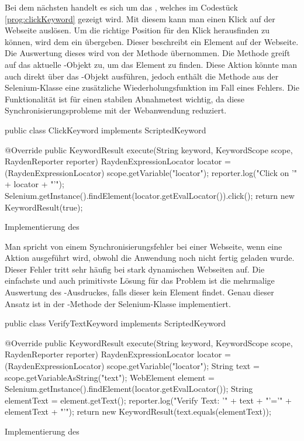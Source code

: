 \SuperPar
Bei dem nächsten  handelt es sich um das , welches im Codestück \ref{prog:clickKeyword} gezeigt wird. Mit diesem  kann man einen Klick auf der Webseite auslösen. Um die richtige Position für den Klick herausfinden zu können, wird dem  ein  übergeben. Dieser  beschreibt ein Element auf der Webseite. Die Auswertung dieses  wird von der Methode  übernommen. Die Methode greift auf das aktuelle -Objekt zu, um das Element zu finden. Diese Aktion könnte man auch direkt über das -Objekt ausführen, jedoch enthält die Methode  aus der Selenium-Klasse eine zusätzliche Wiederholungsfunktion im Fall eines Fehlers. Die Funktionalität ist für einen stabilen Abnahmetest wichtig, da diese Synchronisierungsprobleme mit der Webanwendung reduziert. 

\begin{program}
\begin{JavaCode}
public class ClickKeyword implements ScriptedKeyword {

  @Override
  public KeywordResult execute(String keyword, KeywordScope scope, RaydenReporter reporter) {
    RaydenExpressionLocator locator = (RaydenExpressionLocator) scope.getVariable("locator");
    reporter.log("Click on '" + locator + "'");
    Selenium.getInstance().findElement(locator.getEvalLocator()).click();
    return new KeywordResult(true);
  }
}
\end{JavaCode}
\caption{Implementierung des }
\label{prog:clickKeyword}
\end{program}

\SuperPar
Man spricht von einem Synchronisierungsfehler bei einer Webseite, wenn eine Aktion ausgeführt wird, obwohl die Anwendung noch nicht fertig geladen wurde. Dieser Fehler tritt sehr häufig bei stark dynamischen Webseiten auf. Die einfachste und auch primitivste Lösung für das Problem ist die mehrmalige Auswertung des -Ausdruckes, falls dieser kein Element findet. Genau dieser Ansatz ist in der -Methode der Selenium-Klasse implementiert.

\begin{program}
\begin{JavaCode}
public class VerifyTextKeyword implements ScriptedKeyword {

  @Override
  public KeywordResult execute(String keyword, KeywordScope scope, RaydenReporter reporter) {
    RaydenExpressionLocator locator = (RaydenExpressionLocator) scope.getVariable("locator");
    String text = scope.getVariableAsString("text");
    WebElement element = Selenium.getInstance().findElement(locator.getEvalLocator());
    String elementText = element.getText();
    reporter.log("Verify Text: '" + text + "'='" + elementText + "'");
    return new KeywordResult(text.equals(elementText));
  }
}
\end{JavaCode}
\caption{Implementierung des }
\label{prog:verifyTextKeyword}
\end{program}

